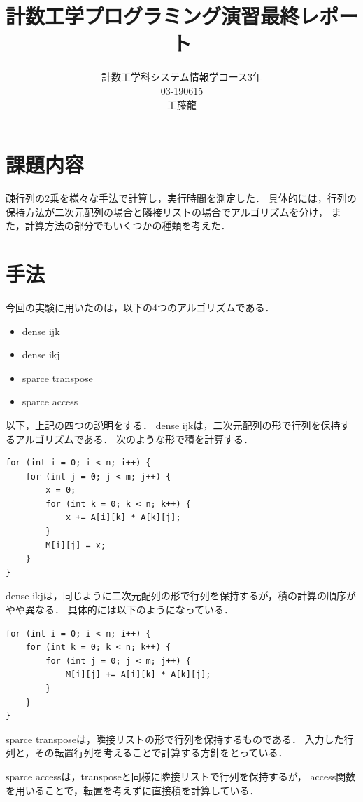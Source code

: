 \documentclass[11pt,a4paper]{jsarticle}
\begin{document}
\title{計数工学プログラミング演習最終レポート}
\author{計数工学科システム情報学コース3年\\03-190615\\工藤龍}
\maketitle

\section{課題内容}

疎行列の2乗を様々な手法で計算し，実行時間を測定した．
具体的には，行列の保持方法が二次元配列の場合と隣接リストの場合でアルゴリズムを分け，
また，計算方法の部分でもいくつかの種類を考えた．

\section{手法}

今回の実験に用いたのは，以下の4つのアルゴリズムである．
\begin{itemize}
\item dense ijk
\item dense ikj
\item sparce transpose
\item sparce access
\end{itemize}
以下，上記の四つの説明をする．
dense ijkは，二次元配列の形で行列を保持するアルゴリズムである．
次のような形で積を計算する．
\begin{lstlisting}
for (int i = 0; i < n; i++) {
    for (int j = 0; j < m; j++) {
        x = 0;
        for (int k = 0; k < n; k++) {
            x += A[i][k] * A[k][j];
        }
        M[i][j] = x;
    }
}
\end{lstlisting}

dense ikjは，同じように二次元配列の形で行列を保持するが，積の計算の順序がやや異なる．
具体的には以下のようになっている．
\begin{lstlisting}
for (int i = 0; i < n; i++) {
    for (int k = 0; k < n; k++) {
        for (int j = 0; j < m; j++) {
            M[i][j] += A[i][k] * A[k][j];
        }
    }
}
\end{lstlisting}

sparce transposeは，隣接リストの形で行列を保持するものである．
入力した行列と，その転置行列を考えることで計算する方針をとっている．

sparce accessは，transposeと同様に隣接リストで行列を保持するが，
access関数を用いることで，転置を考えずに直接積を計算している．
\end{document}
